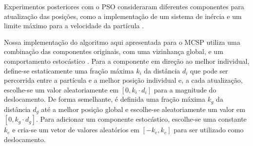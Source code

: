     Experimentos posteriores com o PSO consideraram diferentes componentes para atualização das posições, como a implementação de um sistema de inércia e um limite máximo para a velocidade da partícula \cite{shi_parameter_1998}.

    Nossa implementação do algoritmo aqui apresentada para o MCSP utiliza uma combinação das componentes originais, com uma vizinhança global, e um comportamento estocástico \cite[p.~642]{marti_handbook_2018}. Para a componente em direção ao melhor individual, define-se estaticamente uma fração máxima $k_i$ da distância $d_i$ que pode ser percorrida entre a partícula e a melhor posição individual e, a cada atualização, escolhe-se um valor aleatoriamente em $[0, k_i \cdot d_i]$ para a magnitude do deslocamento. De forma semelhante, é definida uma fração máxima $k_g$ da distância $d_g$ até a melhor posição global e escolhe-se aleatoriamente um valor em $[0, k_g \cdot d_g]$. Para adicionar um componente estocástico, escolhe-se uma constante $k_e$ e cria-se um vetor de valores aleatórios em $[-k_e, k_e]$ para ser utilizado como deslocamento.
    